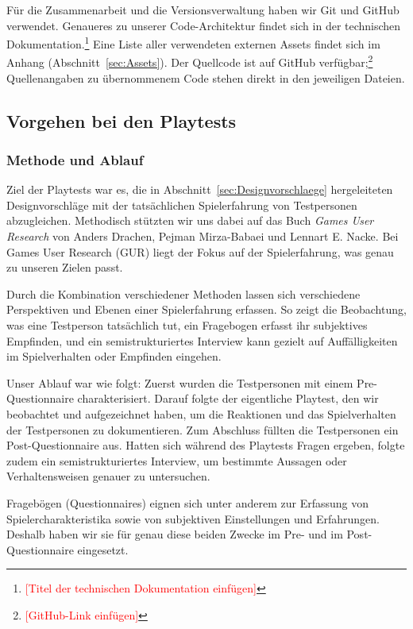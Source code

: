 \documentclass[../Main.tex]{subfiles}
\begin{document}
Für die Zusammenarbeit und die Versionsverwaltung haben wir Git und GitHub verwendet. Genaueres zu unserer Code-Architektur findet sich in der technischen Dokumentation.\footnote{\textcolor{red}{[Titel der technischen Dokumentation einfügen]}} Eine Liste aller verwendeten externen Assets findet sich im Anhang (Abschnitt~\ref{sec:Assets}). Der Quellcode ist auf GitHub verfügbar;\footnote{\textcolor{red}{[GitHub-Link einfügen]}} Quellenangaben zu übernommenem Code stehen direkt in den jeweiligen Dateien.

\subsection{Vorgehen bei den Playtests} \label{sec:VorgehenPlaytest}

\subsubsection{Methode und Ablauf} \label{sec:MethodePlaytest}
Ziel der Playtests war es, die in Abschnitt~\ref{sec:Designvorschlaege} hergeleiteten Designvorschläge mit der tatsächlichen Spielerfahrung von Testpersonen abzugleichen. Methodisch stützten wir uns dabei auf das Buch \textit{Games User Research} von Anders Drachen, Pejman Mirza-Babaei und Lennart E. Nacke.\autocite{drachen2018gamesuserresearch} Bei Games User Research (GUR) liegt der Fokus auf der Spielerfahrung, was genau zu unseren Zielen passt.

Durch die Kombination verschiedener Methoden lassen sich verschiedene Perspektiven und Ebenen einer Spielerfahrung erfassen.\autocite[\textcolor{red}{S.~??}]{drachen2018gamesuserresearch} So zeigt die Beobachtung, was eine Testperson tatsächlich tut, ein Fragebogen erfasst ihr subjektives Empfinden, und ein semistrukturiertes Interview kann gezielt auf Auffälligkeiten im Spielverhalten oder Empfinden eingehen.

Unser Ablauf war wie folgt: Zuerst wurden die Testpersonen mit einem Pre-Questionnaire charakterisiert. Darauf folgte der eigentliche Playtest, den wir beobachtet und aufgezeichnet haben, um die Reaktionen und das Spielverhalten der Testpersonen zu dokumentieren. Zum Abschluss füllten die Testpersonen ein Post-Questionnaire aus. Hatten sich während des Playtests Fragen ergeben, folgte zudem ein semistrukturiertes Interview, um bestimmte Aussagen oder Verhaltensweisen genauer zu untersuchen.

Fragebögen (Questionnaires) eignen sich unter anderem zur Erfassung von Spielercharakteristika sowie von subjektiven Einstellungen und Erfahrungen.\autocite[\textcolor{red}{S.~??}]{drachen2018gamesuserresearch} Deshalb haben wir sie für genau diese beiden Zwecke im Pre- und im Post-Questionnaire eingesetzt.
\end{document}

